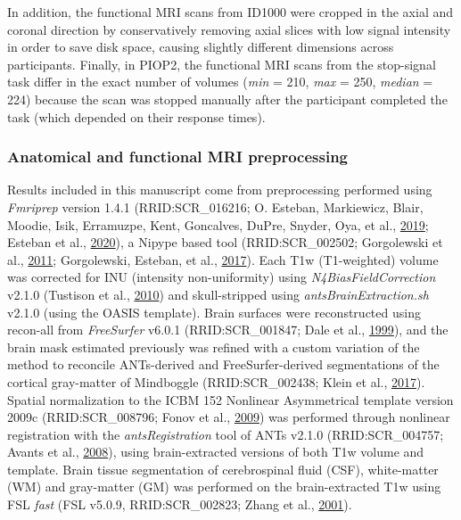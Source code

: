 \documentclass[12pt,american,a4paper,oneside,]{memoir} %
\begin{document}
In addition, the functional MRI scans from ID1000 were cropped in the axial and coronal direction by conservatively removing axial slices with low signal intensity in order to save disk space, causing slightly different dimensions across participants. Finally, in PIOP2, the functional MRI scans from the stop-signal task differ in the exact number of volumes (\emph{min} = 210, \emph{max} = 250, \emph{median} = 224) because the scan was stopped manually after the participant completed the task (which depended on their response times).

\hypertarget{anatomical-and-functional-mri-preprocessing}{%
\subsubsection{Anatomical and functional MRI preprocessing}\label{anatomical-and-functional-mri-preprocessing}}

Results included in this manuscript come from preprocessing performed using \emph{Fmriprep} version 1.4.1 (RRID:SCR\_016216; O. Esteban, Markiewicz, Blair, Moodie, Isik, Erramuzpe, Kent, Goncalves, DuPre, Snyder, Oya, et al., \protect\hyperlink{ref-Esteban2019-ri}{2019}; Esteban et al., \protect\hyperlink{ref-Esteban2020-qw}{2020}), a Nipype based tool (RRID:SCR\_002502; Gorgolewski et al., \protect\hyperlink{ref-Gorgolewski2011-aa}{2011}; Gorgolewski, Esteban, et al., \protect\hyperlink{ref-Gorgolewski2017-gb}{2017}). Each T1w (T1-weighted) volume was corrected for INU (intensity non-uniformity) using \emph{N4BiasFieldCorrection} v2.1.0 (Tustison et al., \protect\hyperlink{ref-Tustison2010-tk}{2010}) and skull-stripped using \emph{antsBrainExtraction.sh} v2.1.0 (using the OASIS template). Brain surfaces were reconstructed using recon-all from \emph{FreeSurfer} v6.0.1 (RRID:SCR\_001847; Dale et al., \protect\hyperlink{ref-Dale1999-rk}{1999}), and the brain mask estimated previously was refined with a custom variation of the method to reconcile ANTs-derived and FreeSurfer-derived segmentations of the cortical gray-matter of Mindboggle (RRID:SCR\_002438; Klein et al., \protect\hyperlink{ref-Klein2017-su}{2017}). Spatial normalization to the ICBM 152 Nonlinear Asymmetrical template version 2009c (RRID:SCR\_008796; Fonov et al., \protect\hyperlink{ref-Fonov2009-sr}{2009}) was performed through nonlinear registration with the \emph{antsRegistration} tool of ANTs v2.1.0 (RRID:SCR\_004757; Avants et al., \protect\hyperlink{ref-Avants2008-bv}{2008}), using brain-extracted versions of both T1w volume and template. Brain tissue segmentation of cerebrospinal fluid (CSF), white-matter (WM) and gray-matter (GM) was performed on the brain-extracted T1w using FSL \emph{fast} (FSL v5.0.9, RRID:SCR\_002823; Zhang et al., \protect\hyperlink{ref-Zhang2001-wa}{2001}).
\end{document}
